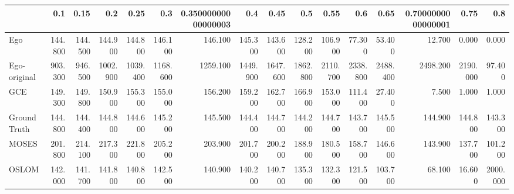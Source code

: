 \begin{tabular}{lrrrrrrrrrrrrrrr}
\toprule
{} &     0.1 &    0.15 &      0.2 &     0.25 &      0.3 & 0.35000000000000003 &      0.4 &     0.45 &      0.5 &     0.55 &      0.6 &     0.65 & 0.7000000000000001 &     0.75 &      0.8 \\
\midrule
Ego          & 144.800 & 144.500 &  144.900 &  144.800 &  146.100 &             146.100 &  145.300 &  143.600 &  128.200 &  106.900 &   77.300 &   53.400 &             12.700 &    0.000 &    0.000 \\
Ego-original & 903.300 & 946.500 & 1002.900 & 1039.400 & 1168.600 &            1259.100 & 1449.900 & 1647.600 & 1862.800 & 2110.700 & 2338.800 & 2488.400 &           2498.200 & 2190.000 &   97.400 \\
GCE          & 149.300 & 149.800 &  150.900 &  155.300 &  155.000 &             156.200 &  159.200 &  162.700 &  166.900 &  153.000 &  111.400 &   27.400 &              7.500 &    1.000 &    1.000 \\
Ground Truth & 144.800 & 144.400 &  144.800 &  144.600 &  145.200 &             145.500 &  144.400 &  144.700 &  144.200 &  144.700 &  143.700 &  145.500 &            144.900 &  144.800 &  143.300 \\
MOSES        & 201.800 & 214.100 &  217.300 &  221.800 &  205.200 &             203.900 &  201.700 &  200.200 &  188.900 &  180.500 &  158.700 &  146.600 &            143.900 &  137.700 &  101.200 \\
OSLOM        & 142.000 & 141.700 &  141.800 &  140.800 &  142.500 &             140.900 &  140.200 &  140.700 &  135.300 &  132.300 &  121.500 &  103.700 &             68.100 &   16.600 & 2000.000 \\
\bottomrule
\end{tabular}
